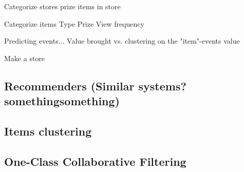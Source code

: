Categorize stores
    prize
    items in store

Categorize items
    Type
    Prize
    View frequency

Predicting events...
    Value brought vs. clustering on the "item"-events value

Make a store















\subsection{Recommenders (Similar systems? somethingsomething)}
\subsection{Items clustering}


\subsection{One-Class Collaborative Filtering}
